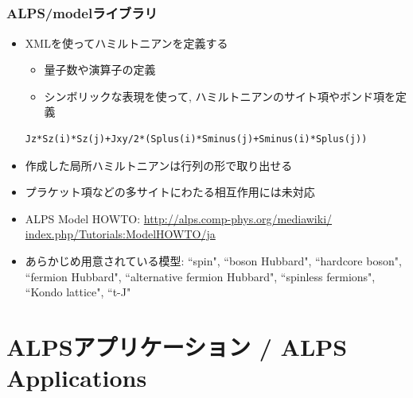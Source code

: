 \subsection*{\redm\whiteb\greenb}
\begin{frame}[t,fragile]
  \frametitle{ALPS/modelライブラリ}
  \begin{itemize}
  \item XMLを使ってハミルトニアンを定義する
    \begin{itemize}  
    \item 量子数や演算子の定義
    \item シンボリックな表現を使って, ハミルトニアンのサイト項やボンド項を定義
    \end{itemize}
    \begin{lstlisting}
Jz*Sz(i)*Sz(j)+Jxy/2*(Splus(i)*Sminus(j)+Sminus(i)*Splus(j))
\end{lstlisting}
  \item 作成した局所ハミルトニアンは行列の形で取り出せる
  \item プラケット項などの多サイトにわたる相互作用には未対応
  \item ALPS Model HOWTO: {\small \href{http://alps.comp-phys.org/mediawiki/index.php/Tutorials:ModelHOWTO/ja}{http://alps.comp-phys.org/mediawiki/ index.php/Tutorials:ModelHOWTO/ja}}
  \item あらかじめ用意されている模型: ``spin", ``boson Hubbard", ``hardcore boson", ``fermion Hubbard", ``alternative fermion Hubbard", ``spinless fermions", ``Kondo lattice", ``t-J"
  \end{itemize}
\end{frame}



\section{ALPSアプリケーション / ALPS Applications}

